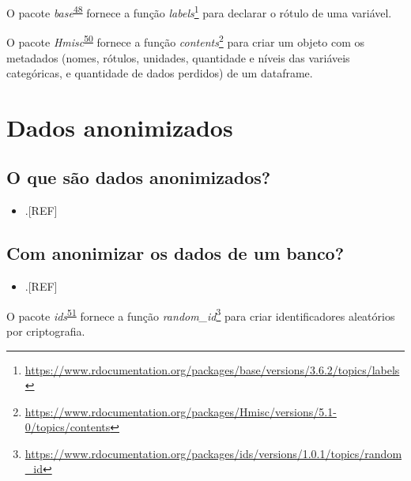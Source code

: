 \documentclass[
  a4paper,
]{book}
\providecommand{\tightlist}{%
  \setlength{\itemsep}{0pt}\setlength{\parskip}{0pt}}
\renewcommand{\href}[2]{#2\footnote{\url{#1}}}
\newenvironment{infobox}[1]
  {
  \begin{itemize}
  \renewcommand{\labelitemi}{
    \raisebox{-.7\height}[0pt][0pt]{
      {\setkeys{Gin}{width=3em,keepaspectratio}
        \texttt{[image: \#1]}}
    }
  }
  \setlength{\fboxsep}{1em}
  \begin{blackbox}
  \item
  }
  {
  \end{blackbox}
  \end{itemize}
  }
\begin{document}
\begin{infobox}{images/Rlogo}
O pacote \emph{base}\textsuperscript{\protect\hyperlink{ref-base-3}{48}} fornece a função \href{https://www.rdocumentation.org/packages/base/versions/3.6.2/topics/labels}{\emph{labels}} para declarar o rótulo de uma variável.

\end{infobox}

\begin{infobox}{images/Rlogo}
O pacote \emph{Hmisc}\textsuperscript{\protect\hyperlink{ref-Hmisc}{50}} fornece a função \href{https://www.rdocumentation.org/packages/Hmisc/versions/5.1-0/topics/contents}{\emph{contents}} para criar um objeto com os metadados (nomes, rótulos, unidades, quantidade e níveis das variáveis categóricas, e quantidade de dados perdidos) de um dataframe.

\end{infobox}

\hypertarget{dados-anonimizados}{%
\section{Dados anonimizados}\label{dados-anonimizados}}

\hypertarget{o-que-suxe3o-dados-anonimizados}{%
\subsection{O que são dados anonimizados?}\label{o-que-suxe3o-dados-anonimizados}}

\begin{itemize}
\tightlist
\item
  .{[}REF{]}
\end{itemize}

\hypertarget{com-anonimizar-os-dados-de-um-banco}{%
\subsection{Com anonimizar os dados de um banco?}\label{com-anonimizar-os-dados-de-um-banco}}

\begin{itemize}
\tightlist
\item
  .{[}REF{]}
\end{itemize}

\begin{infobox}{images/Rlogo}
O pacote \emph{ids}\textsuperscript{\protect\hyperlink{ref-ids}{51}} fornece a função \href{https://www.rdocumentation.org/packages/ids/versions/1.0.1/topics/random_id}{\emph{random\_id}} para criar identificadores aleatórios por criptografia.

\end{infobox}
\end{document}
